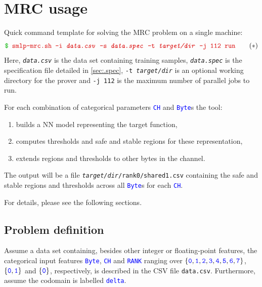 \documentclass[a4paper,parskip=half]{article} %
\newcommand*\cmdstyle\texttt
\newcommand*\file\cmdstyle
\newcommand*\literalColor{blue}
\newcommand*\cmd[1]{\cmdstyle{\textcolor{red!85!black}{#1}}}
\newcommand*\cmdline[1]{\cmdstyle{\textcolor{green!70!black}\$ }\cmd{#1}}
\newcommand*\literal[1]{\textcolor{\literalColor}{\cmdstyle{#1}}}
\newcommand*\progmrc{smlp-mrc.sh}
\newcommand{\delete}[1]{}
\begin{document}

\section{MRC usage}\label{sec:mrc}

Quick command template for solving the MRC problem on a single machine:
\begin{equation}
\cmdline{\progmrc{} -i \emph{data.csv} -s \emph{data.spec} -t \emph{target/dir} -j 112 run}
\tag{$*$}\label{cmd:mrc}
\end{equation}
Here, \file{\emph{data.csv}} is the data set containing training samples,
\file{\emph{data.spec}} is the specification file detailed in \cref{sec:.spec},
\cmdstyle{-t \emph{target/dir}} is an optional working directory for the prover and \cmdstyle{-j 112} is the maximum number of parallel jobs to run.

For each combination of categorical parameters \literal{CH} and \literal{Byte}s the tool: 
\begin{enumerate}
\item builds a NN model representing the target function,
\item computes thresholds and safe and stable regions for these representation,
\item extends regions and thresholds to other bytes in the channel.
\end{enumerate}

The output will be a file \file{\emph{target/dir}/rank0/shared1.csv} containing
the safe and stable regions and thresholds across all \literal{Byte}s for each
\literal{CH}.

For details, please see the following sections.


\subsection{Problem definition}\label{sec:mrc-def}
Assume a data set containing, besides other integer or floating-point features,
the categorical input features \literal{Byte},
\literal{CH} and \literal{RANK} ranging over
$\{\literal0,\literal1,\literal2,\literal3,\literal4,\literal5,\literal6,\literal7\}$,
$\{\literal0,\literal1\}$ and $\{\literal0\}$, respectively,
is described in the CSV file \file{data.csv}. Furthermore, assume the codomain
is labelled \literal{delta}.
\end{document}
